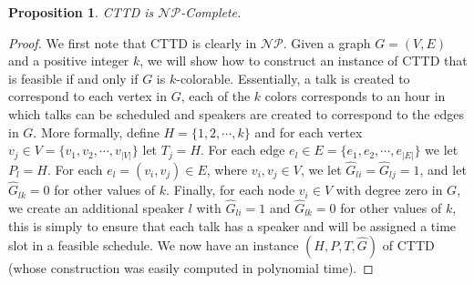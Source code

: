 \documentclass[]{article}
\newtheorem{prop}[thm]{Proposition}
\theoremstyle{definition}
\theoremstyle{remark}
\numberwithin{equation}{section}
\newcommand{\cNP}{$\mathcal{NP}$}
\begin{document}
\begin{prop}
	CTTD is \cNP-Complete.
\end{prop}
\begin{proof}\label{cttd_np}
We first note that CTTD is clearly in \cNP.  
Given a graph $G=(V,E)$ and a positive integer $k$, we will show how to construct an instance of CTTD that is feasible if and only if $G$ is $k$-colorable.
Essentially, a talk is created to correspond to each vertex in $G$, each of the $k$ colors corresponds to an hour in which talks can be scheduled and speakers are created to correspond to the edges in $G$.
More formally, define $H=\{1, 2, \cdots, k\}$ and for each vertex $v_j \in V=\{v_1, v_2, \cdots, v_{|V|}\}$ let $T_j = H$. 
For each edge $e_l \in E=\{e_1, e_2, \cdots, e_{|E|}\}$ we let $P_l = H$. 
For each $e_l = (v_i,v_j)\in E$, where $v_i,v_j \in V$, we let $\hat G_{li} = \hat G_{lj} = 1$, and let $\hat G_{lk}=0$ for other values of $k$. 
Finally, for each node $v_i\in V$ with degree zero in $G$, we create an additional speaker $l$ with $\hat G_{li} = 1$ and $\hat G_{lk}=0$ for other values of $k$, this is simply to ensure that each talk has a speaker and will be assigned a time slot in a feasible schedule.
We now have an instance $(H, P, T, \hat G)$ of CTTD (whose construction was easily computed in polynomial time). 


\end{proof}
\end{document}
